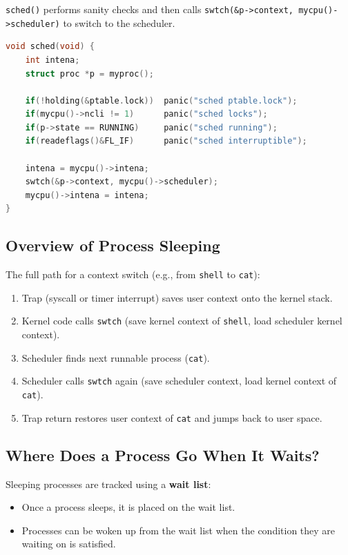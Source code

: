 \documentclass[11pt]{article}
\begin{document}
\texttt{sched()} performs sanity checks and then calls \texttt{swtch(\&p->context, mycpu()->scheduler)} to switch to the scheduler.

\begin{lstlisting}[language=C, caption={sched() in proc.c}]
void sched(void) {
    int intena;
    struct proc *p = myproc();

    if(!holding(&ptable.lock))  panic("sched ptable.lock");
    if(mycpu()->ncli != 1)      panic("sched locks");
    if(p->state == RUNNING)     panic("sched running");
    if(readeflags()&FL_IF)      panic("sched interruptible");

    intena = mycpu()->intena;
    swtch(&p->context, mycpu()->scheduler);
    mycpu()->intena = intena;
}
\end{lstlisting}

\subsection{Overview of Process Sleeping}

The full path for a context switch (e.g., from \texttt{shell} to \texttt{cat}):

\begin{enumerate}
    \item Trap (syscall or timer interrupt) saves user context onto the kernel stack.
    \item Kernel code calls \texttt{swtch} (save kernel context of \texttt{shell}, load scheduler kernel context).
    \item Scheduler finds next runnable process (\texttt{cat}).
    \item Scheduler calls \texttt{swtch} again (save scheduler context, load kernel context of \texttt{cat}).
    \item Trap return restores user context of \texttt{cat} and jumps back to user space.
\end{enumerate}

\subsection{Where Does a Process Go When It Waits?}

Sleeping processes are tracked using a \textbf{wait list}:
\begin{itemize}
    \item Once a process sleeps, it is placed on the wait list.
    \item Processes can be woken up from the wait list when the condition they are waiting on is satisfied.
\end{itemize}
\end{document}
